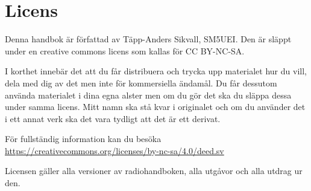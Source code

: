 \section*{Licens}

Denna handbok är författad av Täpp-Anders Sikvall, SM5UEI. Den är
släppt under en creative commons licens som kallas för CC BY-NC-SA.

I korthet innebär det att du får distribuera och trycka upp materialet
hur du vill, dela med dig av det men inte för kommersiella ändamål. Du
får dessutom använda materialet i dina egna alster men om du gör det
ska du släppa dessa under samma licens. Mitt namn ska stå kvar i
originalet och om du använder det i ett annat verk ska det vara
tydligt att det är ett derivat.

För fullständig information kan du besöka\\
\url{https://creativecommons.org/licenses/by-nc-sa/4.0/deed.sv}

Licensen gäller alla versioner av radiohandboken, alla utgåvor och
alla utdrag ur den.

